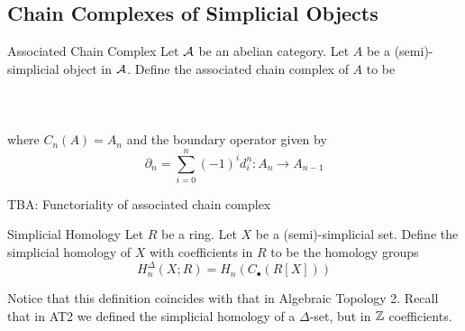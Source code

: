 \documentclass[a4paper]{article}
\begin{document}
\subsection{Chain Complexes of Simplicial Objects}
\begin{defn}{Associated Chain Complex}{} Let $\mathcal{A}$ be an abelian category. Let $A$ be a (semi)-simplicial object in $\mathcal{A}$. Define the associated chain complex of $A$ to be \\~\\
\\~\\
where $C_n(A)=A_n$ and the boundary operator given by $$\partial_n=\sum_{i=0}^n(-1)^id_i^n:A_n\to A_{n-1}$$
\end{defn}

TBA: Functoriality of associated chain complex

\begin{defn}{Simplicial Homology}{} Let $R$ be a ring. Let $X$ be a (semi)-simplicial set. Define the simplicial homology of $X$ with coefficients in $R$ to be the homology groups $$H_n^\Delta(X;R)=H_n(C_\bullet(R[X]))$$
\end{defn}

Notice that this definition coincides with that in Algebraic Topology 2. Recall that in AT2 we defined the simplicial homology of a $\Delta$-set, but in $\mathbb{Z}$ coefficients. 
\end{document}
